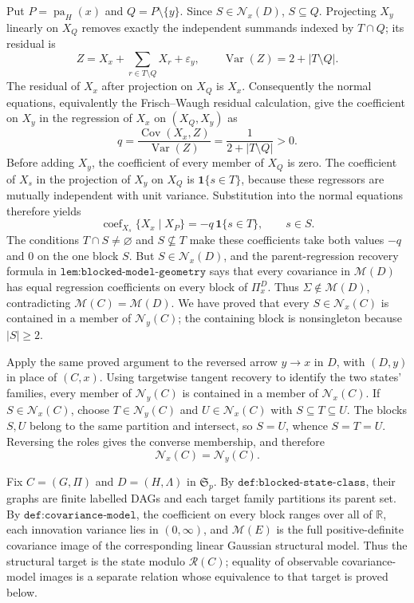 Put \(P=\operatorname{pa}_H(x)\) and \(Q=P\setminus\{y\}\). Since \(S\in\mathcal N_x(D)\), \(S\subseteq Q\). Projecting \(X_y\) linearly on \(X_Q\) removes exactly the independent summands indexed by \(T\cap Q\); its residual is
\[
 Z=X_x+\sum_{r\in T\setminus Q}X_r+\varepsilon_y,
 \qquad
 \operatorname{Var}(Z)=2+|T\setminus Q|.
\]
The residual of \(X_x\) after projection on \(X_Q\) is \(X_x\). Consequently the normal equations, equivalently the Frisch--Waugh residual calculation, give the coefficient on \(X_y\) in the regression of \(X_x\) on \((X_Q,X_y)\) as
\[
 q=\frac{\operatorname{Cov}(X_x,Z)}{\operatorname{Var}(Z)}
   =\frac{1}{2+|T\setminus Q|}>0.
\]
Before adding \(X_y\), the coefficient of every member of \(X_Q\) is zero. The coefficient of \(X_s\) in the projection of \(X_y\) on \(X_Q\) is \(\mathbf 1\{s\in T\}\), because these regressors are mutually independent with unit variance. Substitution into the normal equations therefore yields
\[
 \operatorname{coef}_{X_s}\{X_x\mid X_P\}
 =-q\,\mathbf 1\{s\in T\},\qquad s\in S.
\]
The conditions \(T\cap S\neq\varnothing\) and \(S\nsubseteq T\) make these coefficients take both values \(-q\) and \(0\) on the one block \(S\). But \(S\in\mathcal N_x(D)\), and the parent-regression recovery formula in \(\texttt{lem:blocked-model-geometry}\) says that every covariance in \(\mathcal M(D)\) has equal regression coefficients on every block of \(\Pi^D_x\). Thus \(\Sigma\notin\mathcal M(D)\), contradicting \(\mathcal M(C)=\mathcal M(D)\). We have proved that every \(S\in\mathcal N_x(C)\) is contained in a member of \(\mathcal N_y(C)\); the containing block is nonsingleton because \(|S|\geq2\).

Apply the same proved argument to the reversed arrow \(y\to x\) in \(D\), with \((D,y)\) in place of \((C,x)\). Using targetwise tangent recovery to identify the two states' families, every member of \(\mathcal N_y(C)\) is contained in a member of \(\mathcal N_x(C)\). If \(S\in\mathcal N_x(C)\), choose \(T\in\mathcal N_y(C)\) and \(U\in\mathcal N_x(C)\) with \(S\subseteq T\subseteq U\). The blocks \(S,U\) belong to the same partition and intersect, so \(S=U\), whence \(S=T=U\). Reversing the roles gives the converse membership, and therefore
\[
 \mathcal N_x(C)=\mathcal N_y(C).
\]

Fix \(C=(G,\Pi)\) and \(D=(H,\Lambda)\) in \(\mathfrak S_p\). By \(\texttt{def:blocked-state-class}\), their graphs are finite labelled DAGs and each target family partitions its parent set. By \(\texttt{def:covariance-model}\), the coefficient on every block ranges over all of \(\mathbb R\), each innovation variance lies in \((0,\infty)\), and \(\mathcal M(E)\) is the full positive-definite covariance image of the corresponding linear Gaussian structural model. Thus the structural target is the state modulo \(\mathcal R(C)\); equality of observable covariance-model images is a separate relation whose equivalence to that target is proved below.

